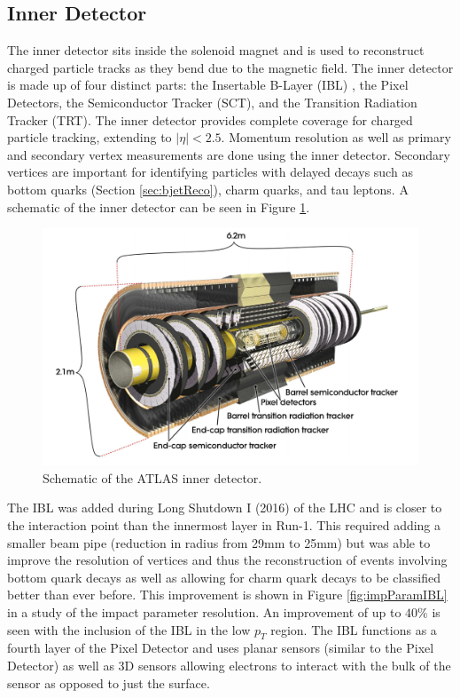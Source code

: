 \subsection{Inner Detector}
\label{sec:InnerDet}
The inner detector sits inside the solenoid magnet and is used to reconstruct charged particle tracks as they bend due to the magnetic field.  The inner detector is made up of four distinct parts: the Insertable B-Layer (IBL) \cite{Capeans:1291633}, the Pixel Detectors, the Semiconductor Tracker (SCT), and the Transition Radiation Tracker (TRT)\cite{CERN-LHCC-97-016}.  The inner detector provides complete coverage for charged particle tracking, extending to $|\eta|<2.5$.  Momentum resolution as well as primary and secondary vertex measurements are done using the inner detector.  Secondary vertices are important for identifying particles with delayed decays such as bottom quarks (Section \ref{sec:bjetReco}), charm quarks, and tau leptons. A schematic of the inner detector can be seen in Figure \ref{fig:ATLASInnerDet}.

\begin{figure}[ht!]
	\centering
	\includegraphics[width=0.8\columnwidth]{../ThesisImages/LHCImages/ATLASInnerDetector.png}
	\caption[Schematic of the ATLAS inner detector.]{Schematic of the ATLAS inner detector\cite{ATLAS}.
	}
	\label{fig:ATLASInnerDet}
\end{figure}

The IBL was added during Long Shutdown I (2016) of the LHC and is closer to the interaction point than the innermost layer in Run-1.  This required adding a smaller beam pipe (reduction in radius from 29mm to 25mm) but was able to improve the resolution of vertices and thus the reconstruction of events involving bottom quark decays as well as allowing for charm quark decays to be classified better than ever before.  This improvement is shown in Figure \ref{fig:impParamIBL} in a study of the impact parameter resolution.  An improvement of up to $40\%$ is seen with the inclusion of the IBL in the low $p_T$ region.  The IBL functions as a fourth layer of the Pixel Detector and uses planar sensors (similar to the Pixel Detector) as well as 3D sensors allowing electrons to interact with the bulk of the sensor as opposed to just the surface. 

